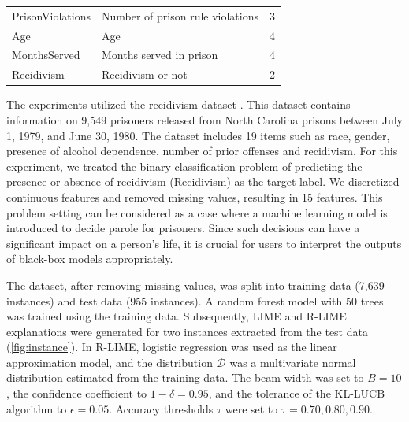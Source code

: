 \documentclass[11pt]{article}
\begin{document}
{\begin{table}[tbp]
\begin{tabular}{llc}
      PrisonViolations       & Number of prison rule violations      & 3                                       \\
      Age                    & Age                                   & 4                                       \\
      MonthsServed           & Months served in prison               & 4                                       \\
      \midrule
      Recidivism             & Recidivism or not                     & 2                                       \\
      \bottomrule
    \end{tabular}
  \end{table}
}

The experiments utilized the recidivism dataset \cite{schmidt1988predicting}.
This dataset contains information on 9,549 prisoners released from
North Carolina prisons between July 1, 1979, and June 30, 1980.
The dataset includes 19 items such as race, gender,
presence of alcohol dependence, number of prior offenses and recidivism.
For this experiment,
we treated the binary classification problem of predicting
the presence or absence of recidivism (Recidivism) as the target label.
We discretized continuous features and removed missing values,
resulting in 15 features.
This problem setting can be considered as a case
where a machine learning model is introduced to decide parole for prisoners.
Since such decisions can have a significant impact on a person's life,
it is crucial for users to interpret the outputs of black-box models appropriately.

The dataset, after removing missing values,
was split into training data (7,639 instances) and test data (955 instances).
A random forest model with 50 trees was trained using the training data.
Subsequently, LIME and R-LIME explanations were generated
for two instances extracted from the test data (\cref{fig:instance}).
In R-LIME, logistic regression was used as the linear approximation model,
and the distribution $\mathcal{D}$ was a multivariate normal distribution
estimated from the training data.
The beam width was set to $B=10$,
the confidence coefficient to $1-\delta=0.95$,
and the tolerance of the KL-LUCB algorithm to $\epsilon=0.05$.
Accuracy thresholds $\tau$ were set to $\tau=0.70,0.80,0.90$.
\end{document}
